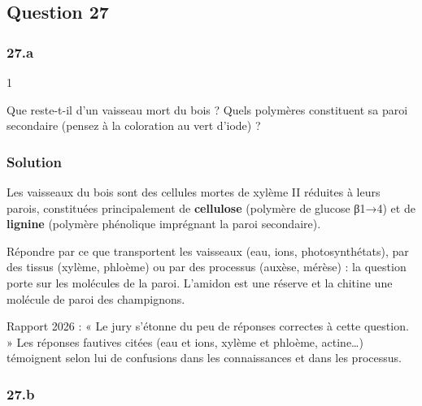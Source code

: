 \documentclass[11pt,a4paper]{article}
\begin{document}
\hypertarget{question-27}{%
\subsection{Question 27}\label{question-27}}

\hypertarget{a}{%
\subsubsection{27.a}\label{a}}

\begin{indication}{1}

Que reste-t-il d'un vaisseau mort du bois ? Quels polymères constituent sa paroi secondaire (pensez à la coloration au vert d'iode) ?

\end{indication}

\hypertarget{solution-26}{%
\subsubsection{Solution}\label{solution-26}}

Les vaisseaux du bois sont des cellules mortes de xylème II réduites à leurs parois, constituées principalement de \textbf{cellulose} (polymère de glucose β1→4) et de \textbf{lignine} (polymère phénolique imprégnant la paroi secondaire).

\begin{piege}

Répondre par ce que transportent les vaisseaux (eau, ions, photosynthétats), par des tissus (xylème, phloème) ou par des processus (auxèse, mérèse) : la question porte sur les molécules de la paroi. L'amidon est une réserve et la chitine une molécule de paroi des champignons.

\end{piege}

\begin{jury}

Rapport 2026 : « Le jury s'étonne du peu de réponses correctes à cette question. » Les réponses fautives citées (eau et ions, xylème et phloème, actine\ldots) témoignent selon lui de confusions dans les connaissances et dans les processus.

\end{jury}

\hypertarget{b}{%
\subsubsection{27.b}\label{b}}
\end{document}
